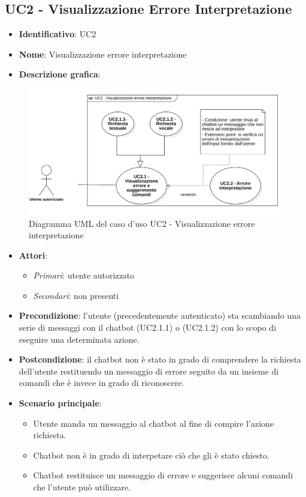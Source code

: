 \subsection{UC2 - Visualizzazione Errore Interpretazione}
\begin{itemize}
    \item \textbf{Identificativo}: UC2
    \item \textbf{Nome}: Visualizzazione errore interpretazione
    \item \textbf{Descrizione grafica}:
\end{itemize}

\begin{figure}[h]
    \includegraphics[scale=0.50]{images/UC2.png} 
    \caption{Diagramma UML del caso d'uso UC2 - Visualizzazione errore interpretazione}
\end{figure}

\begin{itemize}
    \item \textbf{Attori}:
    \begin{itemize} 
        \item \textit{Primari}: utente autorizzato
        \item \textit{Secondari}: non presenti
    \end{itemize}
 \item \textbf{Precondizione}: l'utente (precedentemente autenticato) sta scambiando una serie di messaggi con il chatbot (UC2.1.1) o (UC2.1.2) con lo scopo di eseguire una determinata azione.
 \item \textbf{Postcondizione}: il chatbot non è stato in grado di comprendere la richiesta dell'utente restituendo un messaggio di errore seguito da un insieme di comandi che è invece in grado di riconoscere.   
 \item \textbf{Scenario principale}: 
    \begin{itemize}
        \item Utente manda un messaggio al chatbot al fine di compire l'azione richiesta.
        \item Chatbot non è in grado di interpetare ciò che gli è stato chiesto.
        \item Chatbot restituisce un messaggio di errore e suggerisce alcuni comandi che l'utente può utilizzare.
    \end{itemize}
\end{itemize}
\newpage

